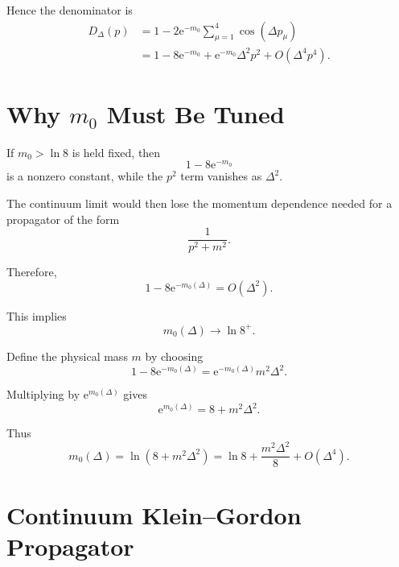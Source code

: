 \documentclass[11pt,a4paper,oneside]{article}
\newcommand{\ee}{\mathrm{e}}
\begin{document}
	Hence the denominator is
	\begin{align}
		D_\Delta(p)
		&=
		1
		-
		2\ee^{-m_0}
		\sum_{\mu=1}^{4}\cos(\Delta p_\mu)
		\\
		&=
		1
		-
		8\ee^{-m_0}
		+
		\ee^{-m_0}\Delta^2p^2
		+
		O(\Delta^4p^4).
		\label{eq:denominator-expansion}
	\end{align}
	
	
	\section{Why $m_0$ Must Be Tuned}
	
	If $m_0>\ln8$ is held fixed, then
	\[
	1-8\ee^{-m_0}
	\]
	is a nonzero constant, while the $p^2$ term vanishes as $\Delta^2$.
	
	The continuum limit would then lose the momentum dependence needed for a
	propagator of the form
	\[
	\frac{1}{p^2+m^2}.
	\]
	
	Therefore,
	\begin{equation}
		\boxed{
			1-8\ee^{-m_0(\Delta)}
			=
			O(\Delta^2).
		}
	\end{equation}
	
	This implies
	\[
	m_0(\Delta)\to\ln8^+.
	\]
	
	Define the physical mass $m$ by choosing
	\begin{equation}
		\boxed{
			1-8\ee^{-m_0(\Delta)}
			=
			\ee^{-m_0(\Delta)}m^2\Delta^2.
		}
		\label{eq:tuning-condition}
	\end{equation}
	
	Multiplying by $\ee^{m_0(\Delta)}$ gives
	\begin{equation}
		\ee^{m_0(\Delta)}
		=
		8+m^2\Delta^2.
	\end{equation}
	
	Thus
	\begin{equation}
		\boxed{
			m_0(\Delta)
			=
			\ln(8+m^2\Delta^2)
			=
			\ln8
			+
			\frac{m^2\Delta^2}{8}
			+
			O(\Delta^4).
		}
		\label{eq:m0-tuning}
	\end{equation}
	
	
	\section{Continuum Klein--Gordon Propagator}
	
\end{document}
